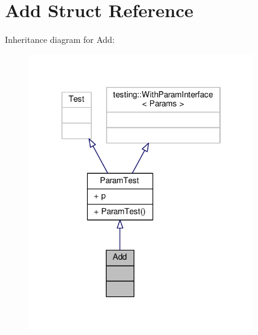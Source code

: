 \hypertarget{struct_add}{}\section{Add Struct Reference}
\label{struct_add}


Inheritance diagram for Add\+:
\nopagebreak
\begin{figure}[H]
\begin{center}
\leavevmode
\includegraphics[width=274pt]{struct_add__inherit__graph}
\end{center}
\end{figure}



